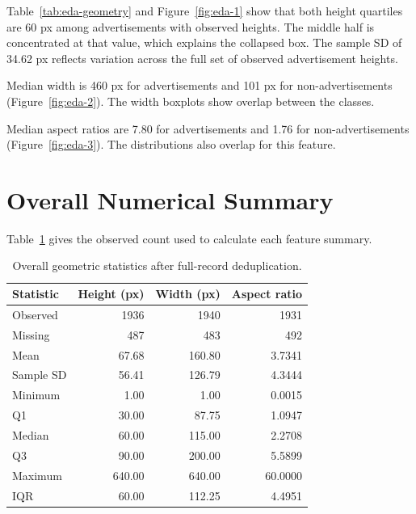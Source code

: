 Table~\ref{tab:eda-geometry} and Figure~\ref{fig:eda-1} show that
both height quartiles are 60 px among advertisements with observed
heights. The middle half is concentrated at that value, which explains
the collapsed box. The sample SD of 34.62 px reflects variation across
the full set of observed advertisement heights.


Median width is 460 px for advertisements and 101 px for
non-advertisements (Figure~\ref{fig:eda-2}). The width boxplots
show overlap between the classes.



Median aspect ratios are 7.80 for advertisements and 1.76 for
non-advertisements (Figure~\ref{fig:eda-3}). The distributions
also overlap for this feature.

\section{Overall Numerical Summary}
Table~\ref{tab:eda-overall} gives the observed count used to calculate each feature summary.

\begin{table}[htbp]
\centering
\small
\caption{Overall geometric statistics after full-record deduplication.}
\label{tab:eda-overall}
\begin{tabular}{lrrr}
\toprule
Statistic & Height (px) & Width (px) & Aspect ratio\\
\midrule
Observed & 1936 & 1940 & 1931\\
Missing & 487 & 483 & 492\\
Mean & 67.68 & 160.80 & 3.7341\\
Sample SD & 56.41 & 126.79 & 4.3444\\
Minimum & 1.00 & 1.00 & 0.0015\\
Q1 & 30.00 & 87.75 & 1.0947\\
Median & 60.00 & 115.00 & 2.2708\\
Q3 & 90.00 & 200.00 & 5.5899\\
Maximum & 640.00 & 640.00 & 60.0000\\
IQR & 60.00 & 112.25 & 4.4951\\
\bottomrule
\end{tabular}
\end{table}

